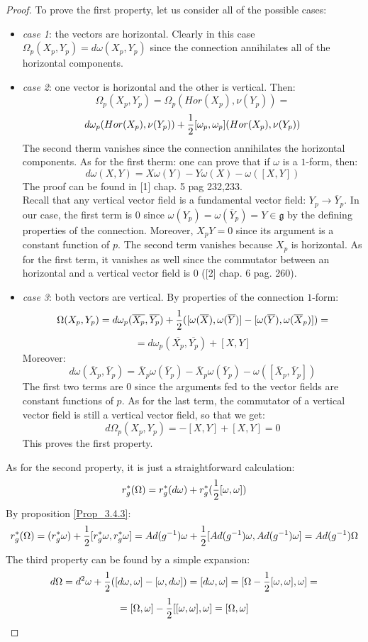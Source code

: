 \documentclass[12pt,a4paper]{report}
\theoremstyle{definition}
\theoremstyle{Theorem}
\theoremstyle{definition}
\theoremstyle{definition}
\begin{document}
	\begin{proof}
		To prove the first property, let us consider all of the possible cases:
		\begin{itemize}
			\item \textit{case 1}: the vectors are horizontal. Clearly in this case $\Omega_p(X_p,Y_p)=d\omega(X_p,Y_p)$ since the connection annihilates all of the horizontal components.
			\item \textit{case 2}: one vector is horizontal and the other is vertical. Then:
			$$\Omega_p(X_p,Y_p)=\Omega_p(Hor(X_p),\nu(Y_p))=$$
			$$d\omega_p(Hor(X_p),\nu(Y_p))+{1\over 2}[\omega_p,\omega_p](Hor(X_p),\nu(Y_p))$$
			The second therm vanishes since the connection annihilates the horizontal components. As for the first therm: one can prove that if $\omega$ is a $1$-form, then:
			$$d\omega(X,Y)=X\omega(Y)-Y\omega(X)-\omega([X,Y])$$
			The proof can be found in [1] chap. 5 pag 232,233.\\
			Recall that any vertical vector field is a fundamental vector field: $Y_p\rightarrow \overline{Y}_p$. In our case, the first term is 0 since $\omega(Y_p)=\omega(\overline{Y}_p)=Y\in\mathfrak{g}$ by the defining properties of the connection. Moreover, $X_pY=0$ since its argument is a constant function of $p$. The second term vanishes because $X_p$ is horizontal. As for the first term, it vanishes as well since the commutator between an horizontal and a vertical vector field is 0 ([2] chap. 6 pag. 260).
			\item\textit{case 3}: both vectors are vertical. By properties of the connection $1$-form:
			$$\Omega(X_p,Y_p)=d\omega_p(\overline{X_p},\overline{Y_p})+{1\over 2} ([\omega(\overline{X}),\omega(\overline{Y})]-[\omega(\overline{Y}),\omega(\overline{X}_p)])=$$
			$$=d\omega_p(\overline{X_p},\overline{Y_p})+[X,Y]$$
			Moreover:
			$$d\omega(\overline{X}_p,\overline{Y}_p)=\overline{X}_p\omega(\overline{Y}_p)-\overline{X}_p\omega(\overline{Y}_p)-\omega([\overline{X}_p,\overline{Y}_p])$$	
			The first two terms are 0 since the arguments fed to the vector fields are constant functions of $p$. As for the last term, the commutator of a vertical vector field is still a vertical vector field, so that we get:
			$$d\Omega_p(X_p,Y_p)=-[X,Y]+[X,Y]=0$$
			This proves the first property.
		\end{itemize}
		As for the second property, it is just a straightforward calculation:
		$$r^*_g(\Omega)=r^*_g(d\omega)+r^*_g({1\over 2}[\omega,\omega])$$
		By proposition \ref{Prop_3.4.3}:
		$$r^*_g(\Omega)=(r^*_g\omega)+{1\over 2}[r^*_g\omega,r^*_g\omega]=Ad(g^{-1})\omega+{1\over 2}[Ad(g^{-1})\omega,Ad(g^{-1})\omega]=Ad(g^{-1})\Omega$$
		The third property can be found by a simple expansion:
		$$d\Omega=d^2\omega+{1\over 2}([d\omega,\omega]-[\omega,d\omega])=[d\omega,\omega]=[\Omega-{1\over 2}[\omega,\omega],\omega]=$$
		$$=[\Omega,\omega]-{1\over 2}[[\omega,\omega],\omega]=[\Omega,\omega]$$
	\end{proof}
\end{document}
